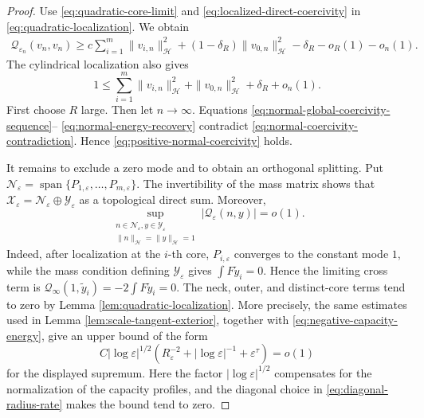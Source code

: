 \documentclass[11pt]{article}
\numberwithin{equation}{section}
\begin{document}
\begin{proof}
Use \eqref{eq:quadratic-core-limit} and
\eqref{eq:localized-direct-coercivity} in
\eqref{eq:quadratic-localization}.  We obtain
\begin{equation}\label{eq:normal-global-coercivity-sequence}
\begin{aligned}
\mathcal Q_{\varepsilon_n}(v_n,v_n)
\geq
c\sum_{i=1}^{m}\|v_{i,n}\|_{\mathcal H}^2
+(1-\delta_R)\|v_{0,n}\|_{\mathcal H}^2-\delta_R-o_R(1)-o_n(1).
\end{aligned}
\end{equation}
The cylindrical localization also gives
\begin{equation}\label{eq:normal-energy-recovery}
1\leq
\sum_{i=1}^{m}\|v_{i,n}\|_{\mathcal H}^2
+\|v_{0,n}\|_{\mathcal H}^2
+\delta_R+o_n(1).
\end{equation}
First choose $R$ large.  Then let $n\to\infty$.
Equations \eqref{eq:normal-global-coercivity-sequence}--
\eqref{eq:normal-energy-recovery} contradict
\eqref{eq:normal-coercivity-contradiction}.  Hence
\eqref{eq:positive-normal-coercivity} holds.

It remains to exclude a zero mode and to obtain an orthogonal
splitting. Put
$\mathcal N_\varepsilon=\operatorname{span}
\{P_{1,\varepsilon},\ldots,P_{m,\varepsilon}\}$. The invertibility of
the mass matrix shows that
$\mathcal X_\varepsilon=\mathcal N_\varepsilon\oplus
\mathcal Y_\varepsilon$ as a topological direct sum. Moreover,
\[
\sup_{\substack{n\in\mathcal N_\varepsilon,
 y\in\mathcal Y_\varepsilon\\
\|n\|_{\mathcal H}=\|y\|_{\mathcal H}=1}}
|\mathcal Q_\varepsilon(n,y)|=o(1).
\]
Indeed, after localization at the $i$-th core,
$P_{i,\varepsilon}$ converges to the constant mode $1$, while the
mass condition defining $\mathcal Y_\varepsilon$ gives
$\int F\widetilde y_i=0$. Hence the limiting cross term is
$\mathcal Q_\infty(1,\widetilde y_i)=-2\int F\widetilde y_i=0$.
The neck, outer, and distinct-core terms tend to zero by Lemma
\ref{lem:quadratic-localization}. More precisely, the same estimates
used in Lemma \ref{lem:scale-tangent-exterior}, together with
\eqref{eq:negative-capacity-energy}, give an upper bound of the form
\[
C|\log\varepsilon|^{1/2}
\left(R_\varepsilon^{-2}+|\log\varepsilon|^{-1}
+\varepsilon^\tau\right)=o(1)
\]
for the displayed supremum. Here the factor
$|\log\varepsilon|^{1/2}$ compensates for the normalization of the
capacity profiles, and the diagonal choice in
\eqref{eq:diagonal-radius-rate} makes the bound tend to zero.


\end{proof}
\end{document}
